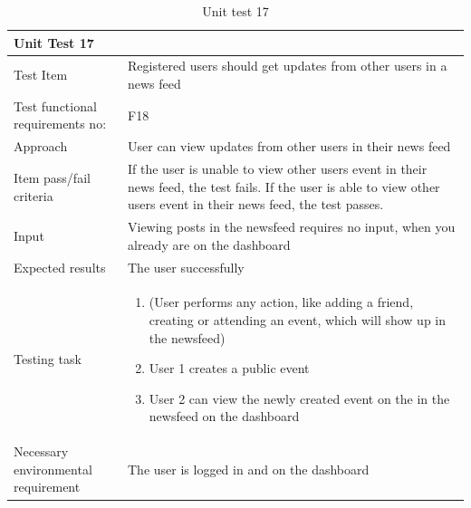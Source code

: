 \begin{table}[H]
\begin{tabular}{ | L{0.25\linewidth} | L{0.75\linewidth} | } 
 \hline {}
 Unit Test 17 &  \\
 \hline
 Test Item & Registered users should get updates from other users in a news feed\\
 \hline
 Test functional requirements no: & F18
 \\
 \hline
 Approach & User can view updates from other users in their news feed\\
  \hline
 Item pass/fail criteria & If the user is unable to view other users event in their news feed, the test fails. If the user is able to view other users event in their news feed, the test passes.\\
 \hline
 Input & Viewing posts in the newsfeed requires no input, when you already are on the dashboard\\ 
 \hline
 Expected results & The user successfully\\
  \hline
Testing task &
    \vspace{-5mm}
    \begin{enumerate}[noitemsep]
  \item[] (User performs any action, like adding a friend, creating or attending an event, which will show up in the newsfeed)
  \item User 1 creates a public event
  \item User 2 can view the newly created event on the in the newsfeed on the dashboard
   \end{enumerate}\\
 \hline
 Necessary environmental requirement & The user is logged in and on the dashboard\\
 \hline
\end{tabular}
\caption{Unit test 17}
\end{table}

